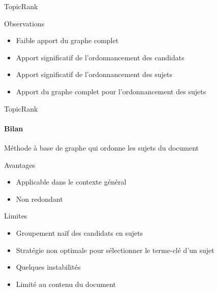 \begin{frame}{TopicRank}
  \vspace{1em}

  \begin{block}{Observations}
    \begin{itemize}
      \item{Faible apport du graphe complet}
      \item{Apport significatif de l'ordonnancement des candidats}
      \item{Apport significatif de l'ordonnancement des sujets}
      \item{Apport du graphe complet pour l'ordonnancement des sujets}
    \end{itemize}
  \end{block}
\end{frame}

\begin{frame}{TopicRank}\framesubtitle{Bilan}
  Méthode à base de graphe qui ordonne les sujets du document

  \vspace{1em}

  \begin{block}{Avantages}
    \begin{itemize}
      \item{Applicable dans le contexte général}
      \item{Non redondant}
    \end{itemize}
  \end{block}

  \vspace{1em}

  \begin{alertblock}{Limites}
    \begin{itemize}
      \item{Groupement naïf des candidats en sujets}
      \item{Stratégie non optimale pour sélectionner le terme-clé d'un sujet}
      \item{Quelques instabilités}
      \item{Limité au contenu du document}
    \end{itemize}
  \end{alertblock}
\end{frame}

